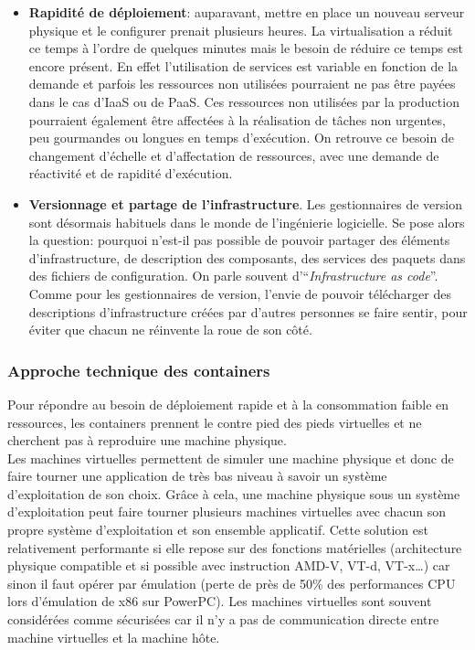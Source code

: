\begin{itemize}
            \item \textbf{Rapidité de déploiement}: auparavant, mettre en place un nouveau serveur physique et le configurer prenait plusieurs heures. La virtualisation a réduit ce temps à l'ordre de quelques minutes mais le besoin de réduire ce temps est encore présent. En effet l'utilisation de services est variable en fonction de la demande et parfois les ressources non utilisées pourraient ne pas être payées dans le cas d'IaaS ou de PaaS. Ces ressources non utilisées par la production pourraient également être affectées à la réalisation de tâches non urgentes, peu gourmandes ou longues en temps d'exécution. On retrouve ce besoin de changement d'échelle et d'affectation de ressources, avec une demande de réactivité et de rapidité d'exécution.
            \item \textbf{Versionnage et partage de l'infrastructure}. Les gestionnaires de version sont désormais habituels dans le monde de l'ingénierie logicielle. Se pose alors la question: pourquoi n'est-il pas possible de pouvoir partager des éléments d'infrastructure, de description des composants, des services des paquets dans des fichiers de configuration. On parle souvent d'\enquote{\textit{Infrastructure as code}}. Comme pour les gestionnaires de version, l'envie de pouvoir télécharger des descriptions d'infrastructure créées par d'autres personnes se faire sentir, pour éviter que chacun ne réinvente la roue de son côté.
        \end{itemize}

     \subsubsection{Approche technique des containers}
        Pour répondre au besoin de déploiement rapide et à la consommation faible en ressources, les containers prennent le contre pied des pieds virtuelles et ne cherchent pas à reproduire une machine physique.\\

        Les machines virtuelles permettent de simuler une machine physique et donc de faire tourner une application de très bas niveau à savoir un système d'exploitation de son choix. Grâce à cela, une machine physique sous un système d'exploitation peut faire tourner plusieurs machines virtuelles avec chacun son propre système d'exploitation et son ensemble applicatif. Cette solution est relativement performante si elle repose sur des fonctions matérielles (architecture physique compatible et si possible avec instruction AMD-V, VT-d, VT-x\dots) car sinon il faut opérer par émulation (perte de près de 50\% des performances CPU lors d'émulation de x86 sur PowerPC)\cite{ipponDocker}. Les machines virtuelles sont souvent considérées comme sécurisées car il n'y a pas de communication directe entre machine virtuelles et la machine hôte.\\

